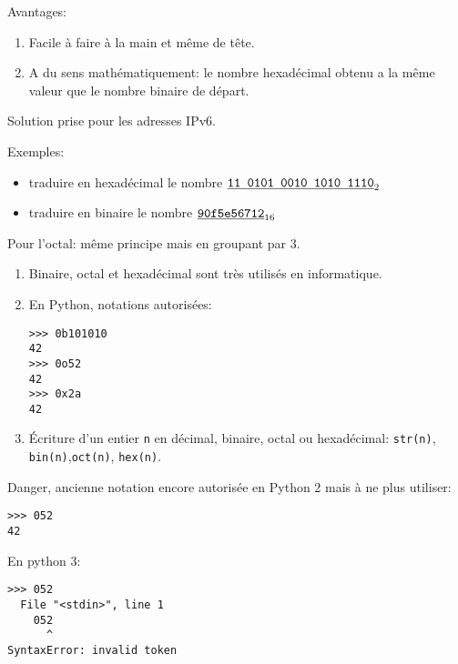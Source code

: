 Avantages:
\begin{enumerate}
\item Facile à faire à la main et même de tête.
\item A du sens mathématiquement: le nombre hexadécimal obtenu a la
  même valeur que le nombre binaire de départ.
\end{enumerate}

Solution prise pour les adresses IPv6.

Exemples:
\begin{itemize}
\item traduire en hexadécimal le nombre
$\underline{\text{\texttt{11 0101 0010 1010 1110}}}_{2}$
\item traduire en binaire le nombre
$\underline{\text{\texttt{90f5e56712}}}_{16}$
\end{itemize}

Pour l'octal: même principe mais en groupant par $3$.

\begin{enumerate}
\item Binaire, octal et hexadécimal sont très utilisés en informatique.
\item En Python, notations autorisées:
  \begin{lstlisting}
>>> 0b101010
42
>>> 0o52
42
>>> 0x2a
42
  \end{lstlisting}
\item Écriture d'un entier \texttt{n} en décimal, binaire, octal ou
  hexadécimal: \texttt{str(n)}, \texttt{bin(n)},\texttt{oct(n)}, \texttt{hex(n)}.
\end{enumerate}

Danger, ancienne notation encore autorisée en Python 2 mais à
  ne plus utiliser:
  \begin{lstlisting}
>>> 052
42
  \end{lstlisting}

En python 3:
  \begin{lstlisting}
>>> 052
  File "<stdin>", line 1
    052
      ^
SyntaxError: invalid token
  \end{lstlisting}
  
